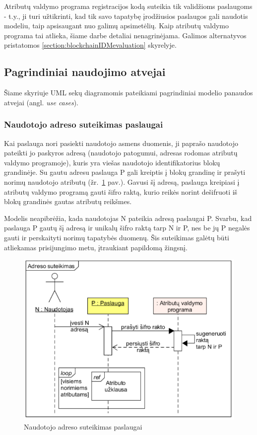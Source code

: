 Atributų valdymo programa registracijos kodą suteikia tik validžioms paslaugoms - t.y., ji turi užtikrinti,
kad tik savo tapatybę įrodžiusios paslaugos gali naudotis modeliu, taip apsisaugant nuo galimų apsimetėlių. Kaip atributų valdymo
programa tai atlieka, šiame darbe detaliai nenagrinėjama. Galimos alternatyvos pristatomos
\hypertarget{section:blockchainIDMevaluation}{\ref{section:blockchainIDMevaluation}} skyrelyje.

\subsection{Pagrindiniai naudojimo atvejai}

Šiame skyriuje UML sekų diagramomis pateikiami pagrindiniai modelio panaudos atvejai (angl. \textit{use cases}).

\subsubsection{Naudotojo adreso suteikimas paslaugai}

Kai paslauga nori pasiekti naudotojo asmens duomenis, ji paprašo naudotojo pateikti jo paskyros adresą (naudotojo patogumui, adresas rodomas
atributų valdymo programoje),
kuris yra viešas naudotojo identifikatorius blokų grandinėje.
Su gautu adresu paslauga P gali kreiptis į blokų grandinę ir 
prašyti norimų naudotojo atributų (žr.\hypertarget{fig:userGivesAddress}{~\ref{fig:userGivesAddress} pav.}).
Gavusi šį adresą, paslauga kreipiasi į atributų valdymo programą gauti šifro raktą, kurio reikės norint
dešifruoti iš blokų grandinės gautas atributų reikšmes.

Modelis neapibrėžia, kada naudotojas N pateikia adresą paslaugai P. Svarbu, kad paslauga P gautų šį adresą ir unikalų šifro raktą tarp N ir P,
nes be jų P negalės gauti ir perskaityti norimų tapatybės duomenų. Šis suteikimas galėtų būti atliekamas prisijungimo metu, įtraukiant
papildomą žingsnį.

\begin{figure}[H]
    \centering
    \includegraphics[scale=0.8]{img/userGivesAddress}
    \caption{Naudotojo adreso suteikimas paslaugai}
    \label{fig:userGivesAddress}
\end{figure}

